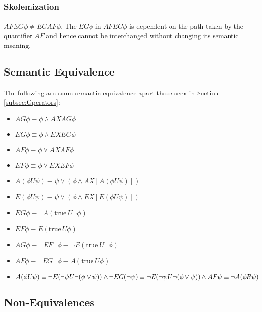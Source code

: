\documentclass{article}
\theoremstyle{plain}
\theoremstyle{definition}
\begin{document}
\begin{multicols}{2}
\subsubsection{Skolemization}

\paragraph{} $AFEG\phi \neq EGAF\phi$. The $EG\phi$ in $AFEG\phi$ is dependent on the path taken by the quantifier $AF$ and hence cannot be interchanged without changing its semantic meaning.

\subsection{Semantic Equivalence}

\paragraph{} The following are some semantic equivalence apart those seen in Section \ref{subsec:Operators}:

\begin{itemize}
\item $AG\phi \equiv \phi \land AXAG\phi$
\item $EG\phi \equiv \phi \land EXEG\phi$
\item $AF\phi \equiv \phi \lor AXAF\phi$
\item $EF\phi \equiv \phi \lor EXEF\phi$
\item $A(\phi U \psi) \equiv \psi \lor (\phi \land AX[A(\phi U \psi)])$
\item $E(\phi U \psi) \equiv \psi \lor (\phi \land EX[E(\phi U \psi)])$
\item $EG\phi \equiv \lnot A(\text{true}\ U \lnot\phi)$
\item $EF\phi \equiv E(\text{true}\ U \phi)$
\item $AG\phi \equiv \lnot EF \lnot\phi \equiv \lnot E(\text{true}\ U \lnot\phi)$
\item $AF\phi \equiv \lnot EG \lnot\phi \equiv A(\text{true}\ U \phi)$
\item $A(\phi U \psi) \equiv \lnot E(\lnot\psi U \lnot(\phi\lor\psi)) \land \lnot EG(\lnot \psi)\\
 \equiv \lnot E(\lnot\psi U \lnot(\phi\lor\psi)) \land AF\psi\\
 \equiv \lnot A(\phi R \psi)$
\end{itemize}

\subsection{Non-Equivalences}


\end{multicols}
\end{document}
